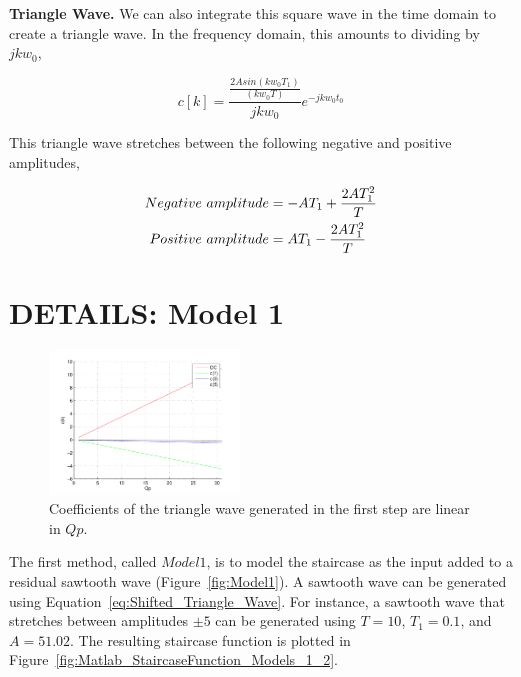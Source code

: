 \documentclass[12pt]{article}
\begin{document}
\textbf{Triangle Wave.}  We can also integrate this square wave in the time domain to create a triangle wave.  In the frequency domain, this amounts to dividing by $jkw_0$,

		\begin{equation}
		c[k] = \frac{\frac{2 A sin(kw_0T_1)}{(kw_0T)}}{jkw_0}e^{-jkw_0t_0}
		\label{eq:Shifted_Triangle_Wave}
		\end{equation}	
						
This triangle wave stretches between the following negative and positive amplitudes,

		\begin{align}
 		Negative \ amplitude &= -AT_1 + \frac{2AT_1^2}{T}\notag\\
 		Positive \ amplitude &= AT_1 - \frac{2AT_1^2}{T}
 		\label{eq:Triangle_Wave_Amplitudes}
 		\end{align}
 		
\section{DETAILS: Model 1}
		\begin{figure}[t]
		\centering				
		\includegraphics[width=0.45\textwidth]{figs/Quantization_6_first_triangle_wave_coefficients_linear_in_Qp}
		\caption{Coefficients of the triangle wave generated in the first step are linear in $Qp$.}
		\label{fig:Linear_in_Qp}
		\end{figure}
		
The first method, called $Model 1$,  is to model the staircase as the input added to a residual sawtooth wave (Figure~\ref{fig:Model1}).  A sawtooth wave can be generated using Equation~\ref{eq:Shifted_Triangle_Wave}.  For instance, a sawtooth wave that stretches between amplitudes $\pm5$ can be generated using $T=10$, $T_1=0.1$, and $A=51.02$. The resulting staircase function is plotted in Figure~\ref{fig:Matlab_StaircaseFunction_Models_1_2}.  
\end{document}
